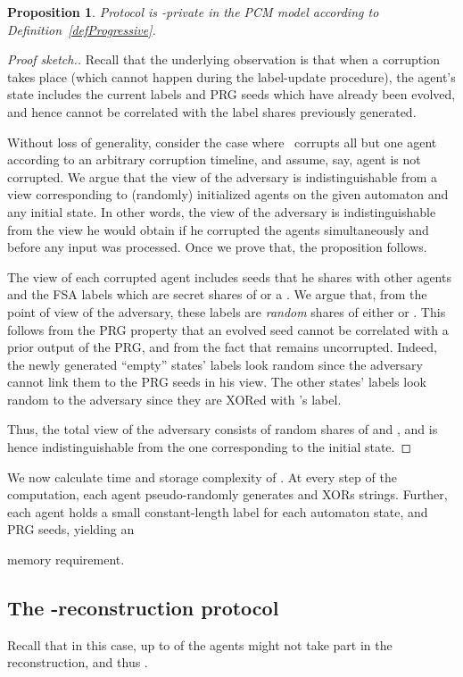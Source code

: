\documentclass[letterpaper,11pt]{article}
\newcommand{\Ad}{}
\newtheorem{proposition}[theorem]{Proposition}
\newenvironment{proofsk}{\begin{proof}[Proof sketch.]}
{\end{proof}}
\begin{document}
\begin{proposition}
\label{prop-pcm-all}
Protocol 
 is -private in the PCM model according to 
Definition~\ref{defProgressive}.
\end{proposition}
\begin {proofsk}
Recall that the underlying observation is that when a corruption takes place
(which cannot happen during the label-update procedure), the agent's state
includes the current labels and PRG seeds which have already been evolved, 
and hence cannot be correlated with the label shares previously
generated.

Without loss of generality, consider the case where \Ad\ corrupts
all but one agent according to an arbitrary corruption timeline,
and assume, say, agent  is not corrupted.  We argue that the 
view of the adversary is indistinguishable from a 
view corresponding to
(randomly) initialized agents  on the given automaton and
any initial state.  In other words, the view of the adversary is
indistinguishable from the view he would obtain if he corrupted the
agents simultaneously and before any input was processed.  Once we
prove that, the proposition follows.

The view of each corrupted agent includes  seeds that he shares
with other agents and the FSA labels which are secret shares of  or
a .  We argue that, from the point of view of the adversary,
these labels are {\em random} shares 
of either  or .  This follows
from the PRG property that an evolved seed cannot be correlated with
a prior output of the PRG, and from the fact that  remains uncorrupted.
Indeed, the newly generated ``empty'' states' labels look random since
the adversary cannot link them to the PRG seeds in his view.  The other
states' labels look random to the adversary since they are XORed
with 's label.

Thus, the total view of the adversary consists of random shares of
 and , and is hence indistinguishable from the one corresponding
to the initial state.
\end{proofsk}




We now calculate time and storage complexity of .
At every step of the
computation, each agent pseudo-randomly generates and XORs  strings.
Further, each agent holds a small constant-length label for each
automaton state, and  PRG seeds, yielding an

memory requirement.



\subsection{The -reconstruction protocol}
\label{sec-from-t}
Recall that in this case, up to  of the agents might not take part
in the reconstruction, and thus .
\end{document}
